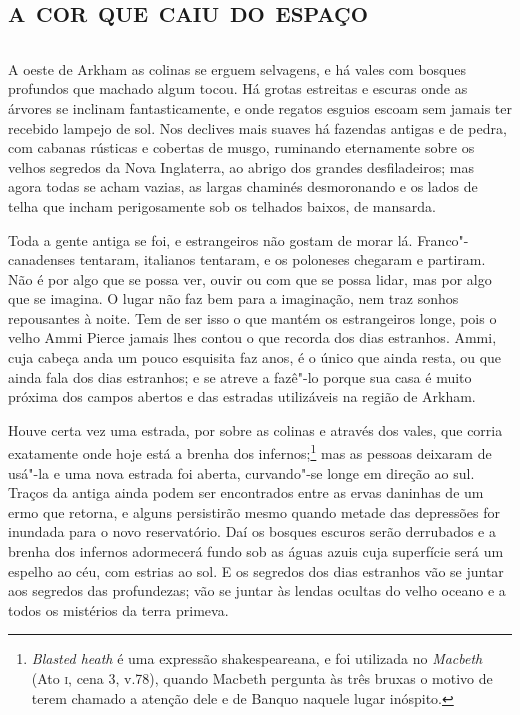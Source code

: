\part{\textsc{a cor que caiu do espaço}}

\chapter*{}

A oeste de Arkham as colinas se erguem selvagens, e há vales com bosques
profundos que machado algum tocou. Há grotas estreitas e escuras onde as
árvores se inclinam fantasticamente, e onde regatos esguios escoam sem
jamais ter recebido lampejo de sol. Nos declives mais suaves há fazendas
antigas e de pedra, com cabanas rústicas e cobertas de musgo, ruminando
eternamente sobre os velhos segredos da Nova Inglaterra, ao abrigo dos
grandes desfiladeiros; mas agora todas se acham vazias, as largas
chaminés desmoronando e os lados de telha que incham perigosamente sob
os telhados baixos, de mansarda.

Toda a gente antiga se foi, e estrangeiros não gostam de morar lá.
Franco"-canadenses tentaram, italianos tentaram, e os poloneses chegaram
e partiram. Não é por algo que se possa ver, ouvir ou com que se possa
lidar, mas por algo que se imagina. O lugar não faz bem para a
imaginação, nem traz sonhos repousantes à noite. Tem de ser isso o que
mantém os estrangeiros longe, pois o velho Ammi Pierce jamais lhes
contou o que recorda dos dias estranhos. Ammi, cuja cabeça anda um pouco
esquisita faz anos, é o único que ainda resta, ou que ainda fala dos
dias estranhos; e se atreve a fazê"-lo porque sua casa é muito próxima
dos campos abertos e das estradas utilizáveis na região de Arkham.

Houve certa vez uma estrada, por sobre as colinas e através dos vales,
que corria exatamente onde hoje está a brenha dos infernos;\footnote{\emph{Blasted
  heath} é uma expressão shakespeareana, e foi utilizada no
  \emph{Macbeth} (Ato \textsc{i}, cena 3, v.78), quando Macbeth pergunta às três
  bruxas o motivo de terem chamado a atenção dele e de Banquo naquele
  lugar inóspito.} mas as pessoas deixaram de usá"-la e uma nova estrada
foi aberta, curvando"-se longe em direção ao sul. Traços da antiga ainda
podem ser encontrados entre as ervas daninhas de um ermo que retorna, e
alguns persistirão mesmo quando metade das depressões for inundada para
o novo reservatório. Daí os bosques escuros serão derrubados e a brenha
dos infernos adormecerá fundo sob as águas azuis cuja superfície será um
espelho ao céu, com estrias ao sol. E os segredos dos dias estranhos vão
se juntar aos segredos das profundezas; vão se juntar às lendas ocultas
do velho oceano e a todos os mistérios da terra primeva.

